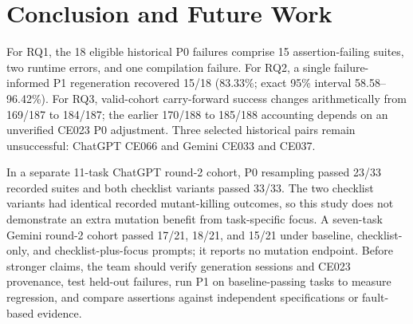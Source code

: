 \section{Conclusion and Future Work}
\label{sec:conclusion}
For RQ1, the 18 eligible historical P0 failures comprise 15 assertion-failing suites, two runtime errors, and one compilation failure. For RQ2, a single failure-informed P1 regeneration recovered 15/18 (83.33\%; exact 95\% interval 58.58--96.42\%). For RQ3, valid-cohort carry-forward success changes arithmetically from 169/187 to 184/187; the earlier 170/188 to 185/188 accounting depends on an unverified CE023 P0 adjustment. Three selected historical pairs remain unsuccessful: ChatGPT CE066 and Gemini CE033 and CE037.

In a separate 11-task ChatGPT round-2 cohort, P0 resampling passed 23/33 recorded suites and both checklist variants passed 33/33. The two checklist variants had identical recorded mutant-killing outcomes, so this study does not demonstrate an extra mutation benefit from task-specific focus. A seven-task Gemini round-2 cohort passed 17/21, 18/21, and 15/21 under baseline, checklist-only, and checklist-plus-focus prompts; it reports no mutation endpoint. Before stronger claims, the team should verify generation sessions and CE023 provenance, test held-out failures, run P1 on baseline-passing tasks to measure regression, and compare assertions against independent specifications or fault-based evidence.
